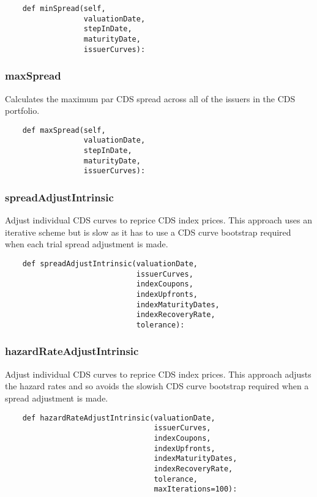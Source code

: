 \documentclass[twoside,11pt]{book}
\begin{document}
\begin{lstlisting}
    def minSpread(self,
                  valuationDate,
                  stepInDate,
                  maturityDate,
                  issuerCurves):
\end{lstlisting}

\subsubsection*{{\bf maxSpread}}
Calculates the maximum par CDS spread across all of the issuers in the CDS portfolio.  

\begin{lstlisting}
    def maxSpread(self,
                  valuationDate,
                  stepInDate,
                  maturityDate,
                  issuerCurves):
\end{lstlisting}

\subsubsection*{{\bf spreadAdjustIntrinsic}}
Adjust individual CDS curves to reprice CDS index prices. This approach uses an iterative scheme but is slow as it has to use a CDS curve bootstrap required when each trial spread adjustment is made. 

\begin{lstlisting}
    def spreadAdjustIntrinsic(valuationDate,
                              issuerCurves,
                              indexCoupons,
                              indexUpfronts,
                              indexMaturityDates,
                              indexRecoveryRate,
                              tolerance):
\end{lstlisting}

\subsubsection*{{\bf hazardRateAdjustIntrinsic}}
Adjust individual CDS curves to reprice CDS index prices. This approach adjusts the hazard rates and so avoids the slowish CDS curve bootstrap required when a spread adjustment is made. 

\begin{lstlisting}
    def hazardRateAdjustIntrinsic(valuationDate,
                                  issuerCurves,
                                  indexCoupons,
                                  indexUpfronts,
                                  indexMaturityDates,
                                  indexRecoveryRate,
                                  tolerance,
                                  maxIterations=100):
\end{lstlisting}
\end{document}
